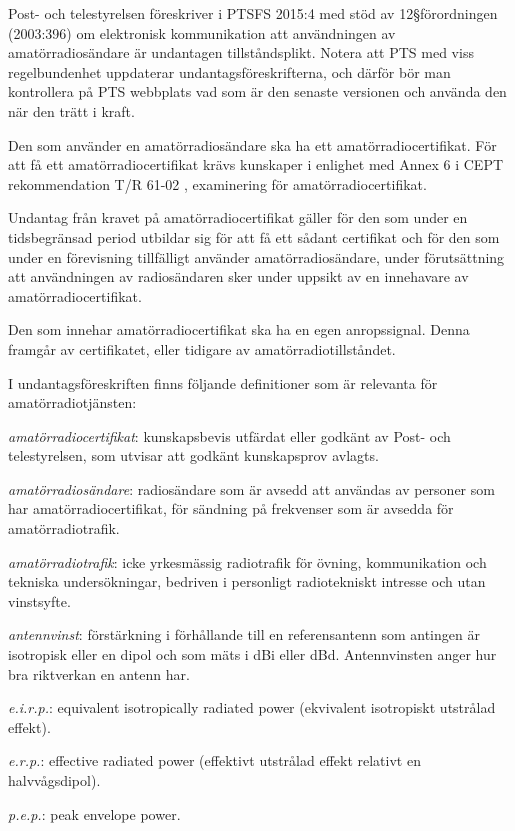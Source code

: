 Post- och telestyrelsen föreskriver i PTSFS 2015:4 \cite{PTSFS2015:4} med stöd
av 12\S förordningen (2003:396) \cite{SFS2003:396} om elektronisk kommunikation
att användningen av amatörradiosändare är undantagen tillståndsplikt.
Notera att PTS med viss regelbundenhet uppdaterar undantagsföreskrifterna,
och därför bör man kontrollera på PTS webbplats vad som är den senaste versionen
och använda den när den trätt i kraft.

Den som använder en amatörradiosändare ska ha ett amatörradiocertifikat.
För att få ett amatörradiocertifikat krävs kunskaper i enlighet med Annex 6 i
CEPT rekommendation T/R 61-02 \cite{TR6102}, examinering för
amatörradiocertifikat.

Undantag från kravet på amatörradiocertifikat gäller för den som under en
tidsbegränsad period utbildar sig för att få ett sådant certifikat och för
den som under en förevisning tillfälligt använder amatörradiosändare, under
förutsättning att användningen av radiosändaren sker under uppsikt av en
innehavare av amatörradiocertifikat.

Den som innehar amatörradiocertifikat ska ha en egen anropssignal.
Denna framgår av certifikatet, eller tidigare av amatörradiotillståndet.

I undantagsföreskriften \cite{PTSFS2015:4} finns följande definitioner som är
relevanta för amatörradiotjänsten:

\emph{amatörradiocertifikat}: kunskapsbevis utfärdat eller godkänt av
Post- och telestyrelsen, som utvisar att godkänt kunskapsprov avlagts.

\emph{amatörradiosändare}: radiosändare som är avsedd att användas av personer
som har amatörradiocertifikat, för sändning på frekvenser som är avsedda för
amatörradiotrafik.

\emph{amatörradiotrafik}: icke yrkesmässig radiotrafik för övning,
kommunikation och tekniska undersökningar, bedriven i personligt radiotekniskt
intresse och utan vinstsyfte.

\emph{antennvinst}: förstärkning i förhållande till en referensantenn som
antingen är isotropisk eller en dipol och som mäts i dBi eller dBd.
Antennvinsten anger hur bra riktverkan en antenn har.

\emph{e.i.r.p.}: equivalent isotropically radiated power (ekvivalent
isotropiskt utstrålad effekt).

\emph{e.r.p.}: effective radiated power (effektivt utstrålad effekt relativt en
halvvågsdipol).

\emph{p.e.p.}: peak envelope power.

